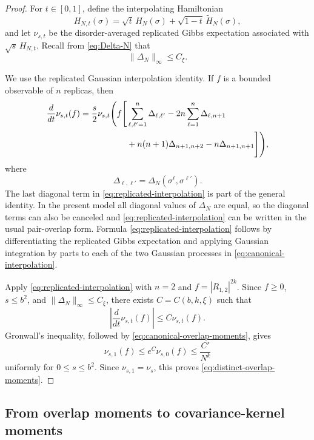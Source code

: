 \documentclass[letterpaper,11pt,reqno]{amsart}
\renewcommand{\leq}{\leqslant}
\renewcommand{\geq}{\geqslant}
\begin{document}
\begin{proof}
For $t\in[0,1]$, define the interpolating Hamiltonian
\begin{equation}
H_{N,t}(\sigma)
=
\sqrt{t}\,H_N (\sigma)+\sqrt{1-t}\,\widetilde H_N(\sigma),
\label{eq:canonical-interpolation}
\end{equation}
and let $\nu_{s,t}$ be the disorder-averaged replicated Gibbs
expectation associated with $\sqrt{s}\,H_{N,t}$. Recall from
\eqref{eq:Delta-N} that
\[
\|\Delta_N\|_\infty\leq C_\xi.
\]

We use the replicated Gaussian interpolation identity. If $f$ is a
bounded observable of $n$ replicas, then
\begin{align}
\frac{d}{dt}\nu_{s,t}(f)
=
\frac{s}{2}\nu_{s,t}\Bigg(
 f\Bigg[&
\sum_{\ell,\ell'=1}^n\Delta_{\ell,\ell'}
-2n\sum_{\ell=1}^n\Delta_{\ell,n+1}
\notag\\
&+n(n+1)\Delta_{n+1,n+2}
-n\Delta_{n+1,n+1}
\Bigg]
\Bigg),
\label{eq:replicated-interpolation}
\end{align}
where
\[
\Delta_{\ell,\ell'}
=
\Delta_N(\sigma^\ell,\sigma^{\ell'}).
\]
The last diagonal term in \eqref{eq:replicated-interpolation} is part
of the general identity. In the present model all diagonal values of
$\Delta_N$ are equal, so the diagonal terms can also be canceled and
\eqref{eq:replicated-interpolation} can be written in the usual
pair-overlap form. Formula \eqref{eq:replicated-interpolation} follows
by differentiating the replicated Gibbs expectation and applying
Gaussian integration by parts to each of the two Gaussian processes in
\eqref{eq:canonical-interpolation}.

Apply \eqref{eq:replicated-interpolation} with $n=2$ and
$f=|R_{1,2}|^{2k}$. Since $f\geq0$, $s\leq b^2$, and
$\|\Delta_N\|_\infty\leq C_\xi$, there exists
$C=C(b,k,\xi)$ such that
\begin{equation}
\left|
\frac{d}{dt}\nu_{s,t}(f)
\right|
\leq
C\nu_{s,t}(f).
\label{eq:gronwall-differential}
\end{equation}
Gronwall's inequality, followed by
\eqref{eq:canonical-overlap-moments}, gives
\[
\nu_{s,1}(f)
\leq
e^C\nu_{s,0}(f)
\leq
\frac{C'}{N^k}
\]
uniformly for $0\leq s\leq b^2$. Since $\nu_{s,1}=\nu_s$,
this proves \eqref{eq:distinct-overlap-moments}.
\end{proof}

\subsection{From overlap moments to covariance-kernel moments}
\label{subsec:kernel-moments}
\end{document}
